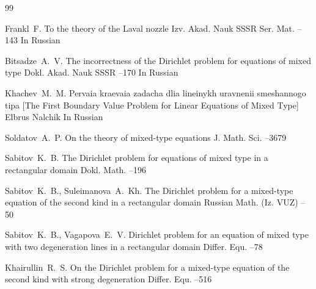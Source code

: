 \begin{thebibliography}{99}


\by Frankl~F.
\paper To the theory of the Laval nozzle
\jour Izv. Akad. Nauk SSSR Ser. Mat.
--143
\lang In Russian


\by Bitsadze~A.~V.
\paper The incorrectness of the Dirichlet problem for equations of mixed type
\jour Dokl. Akad. Nauk SSSR
--170
\lang In Russian


\by Khachev~M.~M.
\book Pervaia kraevaia zadacha dlia lineinykh uravnenii smeshannogo tipa \rm [The First Boundary Value Problem for Linear Equations of Mixed Type]
\publ Elbrus
\publaddr Nalchik
\lang In Russian


\by Soldatov~A.~P.
\paper On the theory of mixed-type equations
\jour J. Math. Sci. 
--3679 


\by Sabitov~K.~B.
\paper The Dirichlet problem for equations of mixed type in a rectangular domain
\jour Dokl. Math.
–196

\by Sabitov~K.~B., Suleimanova~A.~Kh. 
\paper The Dirichlet problem for a mixed-type equation of the second kind in a rectangular domain
\jour Russian Math. (Iz. VUZ)
--50

\by Sabitov~K.~B., Vagapova~E.~V.
\paper Dirichlet problem for an equation of mixed type with two degeneration lines in a rectangular domain
\jour Differ. Equ.
--78

\by Khairullin~R.~S.
\paper On the Dirichlet problem for a mixed-type equation of the second kind with strong degeneration
\jour Differ. Equ.
--516


\end{thebibliography}
